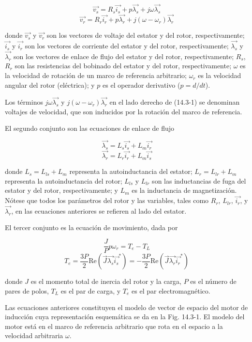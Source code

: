 \documentclass[letterpaper,12pt]{article} %
\begin{document}
\[
\vec{v_s} = R_s \vec{i_s} + p\vec{\lambda_s} + j\omega \vec{\lambda_s}
\]
\[
\vec{v_r} = R_r \vec{i_r} + p\vec{\lambda_r} + j(\omega - \omega_r) \vec{\lambda_r} \tag{14.3-1}
\]

donde \(\vec{v_s}\) y \(\vec{v_r}\) son los vectores de voltaje del estator y del rotor, respectivamente; \(\vec{i_s}\) y \(\vec{i_r}\) son los vectores de corriente del estator y del rotor, respectivamente; \(\vec{\lambda_s}\) y \(\vec{\lambda_r}\) son los vectores de enlace de flujo del estator y del rotor, respectivamente; \(R_s\), \(R_r\) son las resistencias del bobinado del estator y del rotor, respectivamente; \(\omega\) es la velocidad de rotación de un marco de referencia arbitrario; \(\omega_r\) es la velocidad angular del rotor (eléctrica); y \(p\) es el operador derivativo (\(p = d/dt\)).

Los términos \(j\omega \vec{\lambda_s}\) y \(j(\omega - \omega_r) \vec{\lambda_r}\) en el lado derecho de (14.3-1) se denominan voltajes de velocidad, que son inducidos por la rotación del marco de referencia.

El segundo conjunto son las ecuaciones de enlace de flujo

\[
\vec{\lambda_s} = L_s \vec{i_s} + L_m \vec{i_r}
\]
\[
\vec{\lambda_r} = L_r \vec{i_r} + L_m \vec{i_s} \tag{14.3-2}
\]

donde \(L_s = L_{ls} + L_m\) representa la autoinductancia del estator; \(L_r = L_{lr} + L_m\) representa la autoinductancia del rotor; \(L_{ls}\) y \(L_{lr}\) son las inductancias de fuga del estator y del rotor, respectivamente; y \(L_m\) es la inductancia de magnetización. Nótese que todos los parámetros del rotor y las variables, tales como \(R_r\), \(L_{lr}\), \(\vec{i_r}\), y \(\vec{\lambda_r}\), en las ecuaciones anteriores se refieren al lado del estator.

El tercer conjunto es la ecuación de movimiento, dada por

\[
\frac{J}{P} p \omega_r = T_e - T_L
\]
\[
T_e = \frac{3P}{2} \text{Re} (\vec{J} \vec{\lambda_s} \vec{i_s}^*) = -\frac{3P}{2} \text{Re} (\vec{J} \vec{\lambda_r} \vec{i_r}^*) \tag{14.3-3}
\]

donde \(J\) es el momento total de inercia del rotor y la carga, \(P\) es el número de pares de polos, \(T_L\) es el par de carga, y \(T_e\) es el par electromagnético.

Las ecuaciones anteriores constituyen el modelo de vector de espacio del motor de inducción cuya representación esquemática se da en la Fig. 14.3-1. El modelo del motor está en el marco de referencia arbitrario que rota en el espacio a la velocidad arbitraria \(\omega\).
\end{document}

